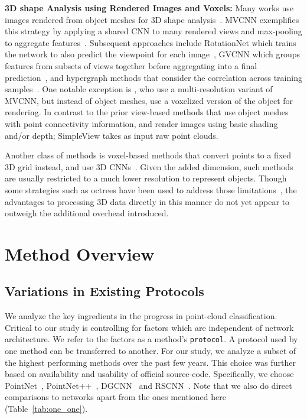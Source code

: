 \documentclass{article}
\newcommand\method{SimpleView}
\begin{document}
\noindent\textbf{3D shape Analysis using Rendered Images and Voxels: } Many works use images rendered from object meshes for 3D shape analysis~\citep{maturana-voxnet-iros15,wu20153d,yu-multiview-cvpr18,guo2016multi,shi2015deeppano,hackel2017semantic3d,song2016deep,song2014sliding,huang2016point,tchapmi2017segcloud}. MVCNN exemplifies this strategy by applying a shared CNN to many rendered views and max-pooling to aggregate features~\citep{su15mvcnn}. Subsequent approaches include RotationNet which trains the network to also predict the viewpoint for each image~\citep{kanezaki-rotationnet-cvpr18}, GVCNN which groups features from subsets of views together before aggregating into a final prediction~\citep{feng2018gvcnn}, and hypergraph methods that consider the correlation across training samples~\citep{zhang2018inductive,feng2019hypergraph}. One notable exception is \cite{qi-volumetric-cvpr16}, who use a multi-resolution variant of MVCNN, but instead of object meshes, use a voxelized version of the object for rendering. In contrast to the prior view-based methods that use object meshes with point connectivity information, and render images using basic shading and/or depth; \method{} takes as input raw point clouds.

Another class of methods is voxel-based methods that convert points to a fixed 3D grid instead, and use 3D CNNs~\citep{qi-volumetric-cvpr16,wu-3dshapenets-cvpr15,maturana-voxnet-iros15}. Given the added dimension, such methods are usually restricted to a much lower resolution to represent objects. Though some strategies such as octrees have been used to address those limitations~\citep{wang2017cnn}, the advantages to processing 3D data directly in this manner do not yet appear to outweigh the additional overhead introduced.


\section{Method Overview}
\subsection{Variations in Existing Protocols}
\label{sec:variation}
We analyze the key ingredients in the progress in point-cloud classification. Critical to our study is controlling for factors which are independent of network architecture. We refer to the factors as a method's \texttt{protocol}. A protocol used by one method can be transferred to another. For our study, we analyze a subset of the highest performing methods over the past few years. This choice was further based on availability and usability of official source-code. Specifically, we choose PointNet~\citep{qi-pointnet-cvpr17}, PointNet++~\citep{qi2017pointnetplusplus}, DGCNN~\citep{wang2018edgeconv} and RSCNN~\citep{liu2019relation}. Note that we also do direct comparisons to networks apart from the ones mentioned here (Table~\ref{tab:one_one}).
\end{document}
